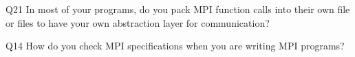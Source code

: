 \begin{description}%
\item{Q21} In most of your programs, do you pack MPI function calls into their own file or files to have your own abstraction layer for communication?%
\item{Q14} How do you check MPI specifications when you are writing MPI programs?%
\end{description}%
